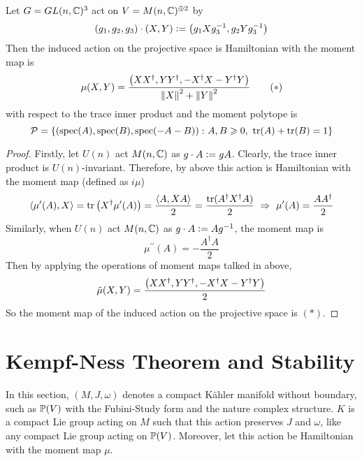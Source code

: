 \documentclass[a4paper,12pt]{article}
\newcommand{\sectionbreak}{\clearpage}
\begin{document}
	\begin{exam}
		Let $G = GL(n,\mathbb{C})^3$ act on $V = M(n,\mathbb{C})^{\oplus 2}$ by
		\begin{equation*}
			(g_1,g_2,g_3) \cdot (X,Y) \vcentcolon= \left(g_1Xg_3^{-1},g_2Yg_3^{-1}\right)
		\end{equation*}
		Then the induced action on the projective space is Hamiltonian with the moment map is
		\begin{equation*}
			\mu(X,Y) = \frac{\left(XX^\dagger,YY^\dagger,-X^\dagger X-Y^\dagger Y\right)}{\left\lVert X\right\lVert^2+\left\lVert Y\right\lVert^2} \tag{$*$}
		\end{equation*}
		with respect to the trace inner product and the moment polytope is
		\begin{equation*}
			\mathcal{P} = \left\{\left(\operatorname{spec}(A),\operatorname{spec}(B),\operatorname{spec}(-A-B)\right) \colon A,B \geqslant 0,~\operatorname{tr}(A)+\operatorname{tr}(B) = 1\right\}
		\end{equation*}
		\begin{proof}
			Firstly, let $U(n)$ act $M(n,\mathbb{C})$ as $g \cdot A \vcentcolon= gA$. Clearly, the trace inner product is $U(n)$-invariant. Therefore, by above this action is Hamiltonian with the moment map (defined as $i\mu$)
			\begin{equation*}
					\left\langle \mu^{\prime}(A),X \right\rangle = \operatorname{tr}\left(X^{\dagger}\mu^{\prime}(A)\right) = \frac{\left\langle A,XA \right\rangle}{2} = \frac{\operatorname{tr}(A^{\dagger}X^{\dagger}A)}{2} ~\Rightarrow~ \mu^{\prime}(A) = \frac{AA^{\dagger}}{2}
			\end{equation*}
			Similarly, when $U(n)$ act $M(n,\mathbb{C})$ as $g \cdot A \vcentcolon= Ag^{-1}$, the moment map is
			\begin{equation*}
				\mu^{\prime\prime}(A) = -\frac{A^{\dagger}A}{2}
			\end{equation*}
			Then by applying the operations of moment maps talked in above,
			\begin{equation*}
				\tilde{\mu}(X,Y) = \frac{\left(XX^\dagger,YY^\dagger,-X^\dagger X-Y^\dagger Y\right)}{2}
			\end{equation*}
			So the moment map of the induced action on the projective space is $(*)$.
		\end{proof}
	\end{exam}

\sectionbreak
	\section{Kempf-Ness Theorem and Stability}

	In this section, $(M,J,\omega)$ denotes a compact K\"ahler manifold without boundary, such as $\mathbb{P}(V)$ with the Fubini-Study form and the nature complex structure. $K$ is a compact Lie group acting on $M$ such that this action preserves $J$ and $\omega$, like any compact Lie group acting on $\mathbb{P}(V)$. Moreover, let this action be Hamiltonian with the moment map $\mu$. 
\end{document}
